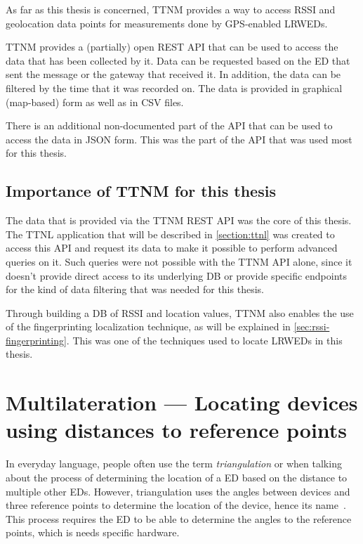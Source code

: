As far as this thesis is concerned, \acl{TTNM} provides a way to access \ac{RSSI} and geolocation data points for measurements done by \ac{GPS}-enabled \aclp{LRWED}.

\ac{TTNM} provides a (partially) open \ac{REST} \ac{API} that can be used to access the data that has been collected by it.
Data can be requested based on the \acl{ED} that sent the message or the gateway that received it.
In addition, the data can be filtered by the time that it was recorded on.
The data is provided in graphical (map-based) form as well as in \ac{CSV} files.

There is an additional non-documented part of the \ac{API} that can be used to access the data in \ac{JSON} form.
This was the part of the \ac{API} that was used most for this thesis.

\subsection{Importance of \acl{TTNM} for this thesis}\label{sec:ttn-mapper-importance}

The data that is provided via the \ac{TTNM} \ac{REST} \ac{API} was the core of this thesis.
The \ac{TTNL} application that will be described in \cref{section:ttnl} was created to access this \ac{API} and request its data to make it possible to perform advanced queries on it.
Such queries were not possible with the \ac{TTNM} \ac{API} alone, since it doesn't provide direct access to its underlying \ac{DB} or provide specific endpoints for the kind of data filtering that was needed for this thesis.

Through building a \ac{DB} of \ac{RSSI} and location values, \ac{TTNM} also enables the use of the fingerprinting localization technique, as will be explained in \cref{sec:rssi-fingerprinting}.
This was one of the techniques used to locate \aclp{LRWED} in this thesis.

\section{Multilateration — Locating devices using distances to reference points}\label{sec:multilateration-basics}

In everyday language, people often use the term \emph{triangulation} or when talking about the process of determining the location of a \acl{ED} based on the distance to multiple other \aclp{ED}.
However, triangulation uses the angles between devices and three reference points to determine the location of the device, hence its name~\cite{yaro_multiangulation_2017}.
This process requires the \acl{ED} to be able to determine the angles to the reference points, which is needs specific hardware.

